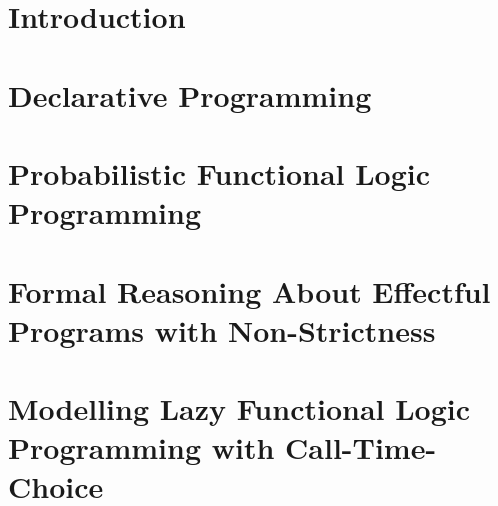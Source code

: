 \documentclass[%
    paper=A4,               %
    twoside=true,           %
    openright,              %
    parskip=false,           %
    chapterprefix=true,     %
    11pt,                   %
    headings=normal,        %
    bibliography=totoc,     %
    listof=totoc,           %
    titlepage=on,           %
    captions=tableabove,    %
    draft=false,            %
]{scrbook}%
\begin{document}

\pagestyle{empty}				%

\cleardoublepage

\pagestyle{plain}				%

\cleardoublepage
%

\cleardoublepage
%
\setcounter{tocdepth}{2}		%
\tableofcontents				%
\cleardoublepage

\setcounter{page}{1}			%
\pagestyle{maincontentstyle} 	%

\chapter{Introduction}
\label{ch:intro}


\chapter{Declarative Programming}
\label{ch:dp}
%

\chapter{Probabilistic Functional Logic Programming}
\label{ch:pflp}


\chapter{Formal Reasoning About Effectful Programs with Non-Strictness}
\label{ch:reasoning} 
%

\chapter{Modelling Lazy Functional Logic Programming with Call-Time-Choice}
\label{ch:modelling} 
%
\end{document}
